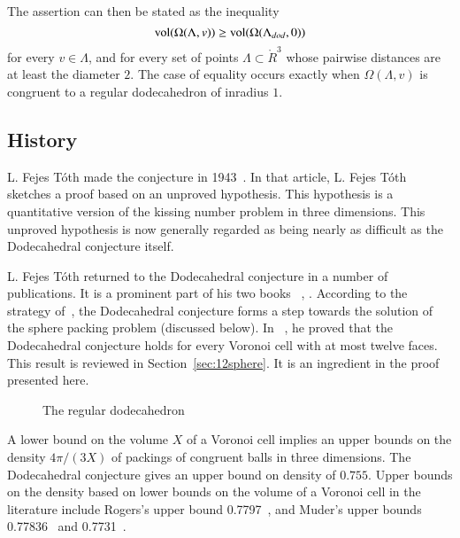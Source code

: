 \documentclass{article} %
\begin{document}
The assertion can then be stated as the inequality
  $$
  {\operatorname{vol}}(\Omega(\Lambda,v)) \ge {\operatorname{vol}}(\Omega(\Lambda_{dod},0))
  $$
for every $v\in\Lambda$, and for every set of points $\Lambda\subset \ring{R}^3$
whose pairwise distances are at least the diameter $2$.
The case of equality occurs exactly when $\Omega(\Lambda,v)$ is
congruent to a regular dodecahedron of inradius $1$.

\subsection{History}

L. Fejes T\'oth made the conjecture in 1943~\cite{Toth:1943:MZ}.  
In that article, L. Fejes T\'oth sketches a proof based on an unproved
hypothesis. This hypothesis is a quantitative version of the kissing
number problem in three dimensions. This unproved hypothesis is now
generally regarded as being nearly as difficult as the Dodecahedral
conjecture itself.

L. Fejes T\'oth returned to the Dodecahedral conjecture in a number of
publications. It is a prominent part of his two books
~\cite{Toth:1972:Lagerungen}, \cite{Toth:1964:Regular}. According to
the strategy of~\cite{Toth:1972:Lagerungen}, the Dodecahedral
conjecture forms a step towards the solution of the sphere packing
problem (discussed below). In~\cite{Toth:1964:Regular} , he proved that the
Dodecahedral conjecture holds for every Voronoi cell with at most
twelve faces. This result is reviewed in Section~\ref{sec:12sphere}.
It is an ingredient in the proof presented here.

\begin{figure}[htb]
  \begin{center}
   \end{center}
  \caption{The regular dodecahedron}
\label{fig:dod}
\end{figure}

A lower bound on the volume $X$ of a Voronoi cell implies
an upper bounds on the density $4\pi/(3X)$ of packings of congruent balls
in three dimensions. The Dodecahedral conjecture gives an upper
bound on density of $0.755$.  
Upper bounds on the density based on lower bounds on the volume of a Voronoi cell
in the literature include Rogers's upper bound 0.7797~\cite{Rogers:1958:Packing}, and Muder's upper 
bounds 0.77836~\cite{Muder:1988:Voronoi} and 0.7731~\cite{Muder:1993:Bound}.
\end{document}

